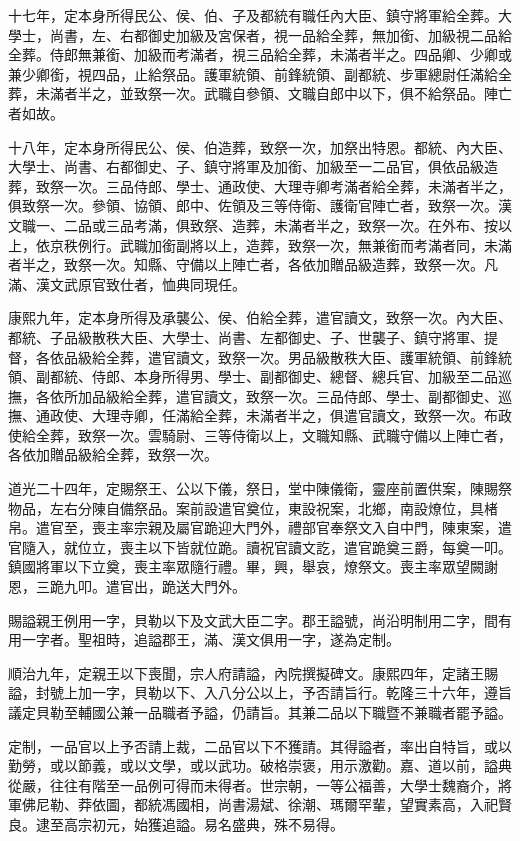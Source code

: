 \begin{pinyinscope}
十七年，定本身所得民公、侯、伯、子及都統有職任內大臣、鎮守將軍給全葬。大學士，尚書，左、右都御史加級及宮保者，視一品給全葬，無加銜、加級視二品給全葬。侍郎無兼銜、加級而考滿者，視三品給全葬，未滿者半之。四品卿、少卿或兼少卿銜，視四品，止給祭品。護軍統領、前鋒統領、副都統、步軍總尉任滿給全葬，未滿者半之，並致祭一次。武職自參領、文職自郎中以下，俱不給祭品。陣亡者如故。

十八年，定本身所得民公、侯、伯造葬，致祭一次，加祭出特恩。都統、內大臣、大學士、尚書、右都御史、子、鎮守將軍及加銜、加級至一二品官，俱依品級造葬，致祭一次。三品侍郎、學士、通政使、大理寺卿考滿者給全葬，未滿者半之，俱致祭一次。參領、協領、郎中、佐領及三等侍衛、護衛官陣亡者，致祭一次。漢文職一、二品或三品考滿，俱致祭、造葬，未滿者半之，致祭一次。在外布、按以上，依京秩例行。武職加銜副將以上，造葬，致祭一次，無兼銜而考滿者同，未滿者半之，致祭一次。知縣、守備以上陣亡者，各依加贈品級造葬，致祭一次。凡滿、漢文武原官致仕者，恤典同現任。

康熙九年，定本身所得及承襲公、侯、伯給全葬，遣官讀文，致祭一次。內大臣、都統、子品級散秩大臣、大學士、尚書、左都御史、子、世襲子、鎮守將軍、提督，各依品級給全葬，遣官讀文，致祭一次。男品級散秩大臣、護軍統領、前鋒統領、副都統、侍郎、本身所得男、學士、副都御史、總督、總兵官、加級至二品巡撫，各依所加品級給全葬，遣官讀文，致祭一次。三品侍郎、學士、副都御史、巡撫、通政使、大理寺卿，任滿給全葬，未滿者半之，俱遣官讀文，致祭一次。布政使給全葬，致祭一次。雲騎尉、三等侍衛以上，文職知縣、武職守備以上陣亡者，各依加贈品級給全葬，致祭一次。

道光二十四年，定賜祭王、公以下儀，祭日，堂中陳儀衛，靈座前置供案，陳賜祭物品，左右分陳自備祭品。案前設遣官奠位，東設祝案，北鄉，南設燎位，具楮帛。遣官至，喪主率宗親及屬官跪迎大門外，禮部官奉祭文入自中門，陳東案，遣官隨入，就位立，喪主以下皆就位跪。讀祝官讀文訖，遣官跪奠三爵，每奠一叩。鎮國將軍以下立奠，喪主率眾隨行禮。畢，興，舉哀，燎祭文。喪主率眾望闕謝恩，三跪九叩。遣官出，跪送大門外。

賜謚親王例用一字，貝勒以下及文武大臣二字。郡王謚號，尚沿明制用二字，間有用一字者。聖祖時，追謚郡王，滿、漢文俱用一字，遂為定制。

順治九年，定親王以下喪聞，宗人府請謚，內院撰擬碑文。康熙四年，定諸王賜謚，封號上加一字，貝勒以下、入八分公以上，予否請旨行。乾隆三十六年，遵旨議定貝勒至輔國公兼一品職者予謚，仍請旨。其兼二品以下職暨不兼職者罷予謚。

定制，一品官以上予否請上裁，二品官以下不獲請。其得謚者，率出自特旨，或以勤勞，或以節義，或以文學，或以武功。破格崇褒，用示激勸。嘉、道以前，謚典從嚴，往往有階至一品例可得而未得者。世宗朝，一等公福善，大學士魏裔介，將軍佛尼勒、莽依圖，都統馮國相，尚書湯斌、徐潮、瑪爾罕輩，望實素高，入祀賢良。逮至高宗初元，始獲追謚。易名盛典，殊不易得。


\end{pinyinscope}
